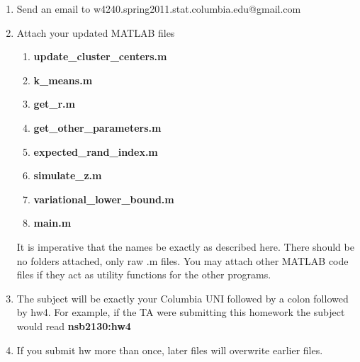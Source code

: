 \documentclass[12pt]{article}
\begin{document}
\begin{enumerate}
	\item Send an email to w4240.spring2011.stat.columbia.edu@gmail.com
	\item {Attach your updated MATLAB files 
		\begin{enumerate}
			\item {\bf update\_cluster\_centers.m} 
			\item	 {\bf k\_means.m}
			\item  {\bf get\_r.m}
			\item {\bf get\_other\_parameters.m}
			\item  {\bf expected\_rand\_index.m}
			\item {\bf simulate\_z.m}
			\item {\bf variational\_lower\_bound.m}
			\item  {\bf main.m}
		\end{enumerate} It is imperative that the names be exactly as described here. There should be no folders attached, only raw .m files.  You may attach other MATLAB code files if they act as utility functions for the other programs. }
	\item The subject will be exactly your Columbia UNI followed by a colon followed by hw4.  For example, if the TA were submitting this homework the subject would read {\bf nsb2130:hw4}
	\item If you submit hw more than once, later files will overwrite earlier files.
\end{enumerate}


\problemsdone
\end{document}
